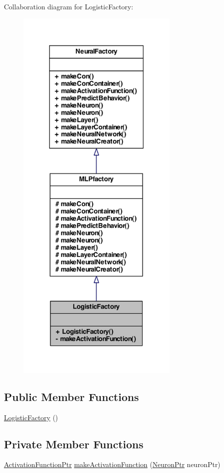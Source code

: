 Collaboration diagram for LogisticFactory:
\nopagebreak
\begin{figure}[H]
\begin{center}
\leavevmode
\includegraphics[width=222pt]{class_logistic_factory__coll__graph}
\end{center}
\end{figure}
\subsection*{Public Member Functions}
\begin{DoxyCompactItemize}
\item 
\hyperlink{class_logistic_factory_a65649392e9c0bd18799d88bbc69fcdb0}{LogisticFactory} ()
\end{DoxyCompactItemize}
\subsection*{Private Member Functions}
\begin{DoxyCompactItemize}
\item 
\hyperlink{_a_m_o_r_e_8h_a77602a0277a02e5769c3df0adc669b17}{ActivationFunctionPtr} \hyperlink{class_logistic_factory_a43d3c7497e5f4058f514f86cfd25d9f8}{makeActivationFunction} (\hyperlink{_a_m_o_r_e_8h_ac1ea936c2c7728eb382278131652fef4}{NeuronPtr} neuronPtr)
\end{DoxyCompactItemize}


